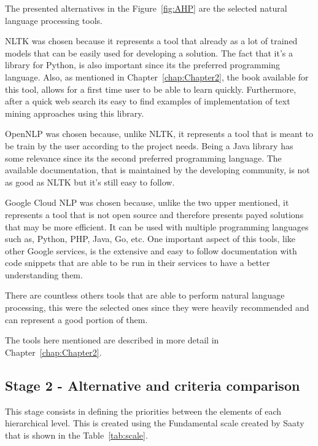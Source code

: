 The presented alternatives in the Figure~\ref{fig:AHP} are the selected natural language processing tools.

NLTK was chosen because it represents a tool that already as a lot of trained models that can be easily used for developing a solution.
The fact that  it's a library for Python, is also important since its the preferred programming language.
Also, as mentioned in Chapter~\ref{chap:Chapter2}, the book available for this tool, allows for a first time user to be able to learn quickly.
Furthermore, after a quick web search its easy to find examples of implementation of text mining approaches using this library.

OpenNLP was chosen because, unlike NLTK, it represents a tool that is meant to be train by the user according to the project needs.
Being a Java library has some relevance since its the second preferred programming language.
The available documentation, that is maintained by the developing community, is not as good as NLTK but it's still easy to follow.

Google Cloud NLP was chosen because, unlike the two upper mentioned, it represents a tool that is not open source and therefore presents payed solutions that may be more efficient.
It can be used with multiple programming languages such as, Python, PHP, Java, Go, etc.
One important aspect of this tools, like other Google services, is the extensive and easy to follow documentation with code snippets that are able to be run in their services to have a better understanding them.

There are countless others tools that are able to perform natural language processing, this were the selected ones since they were heavily recommended and can represent a good portion of them.

The tools here mentioned are described in more detail in Chapter~\ref{chap:Chapter2}.

\subsection{Stage 2 - Alternative and criteria comparison}

This stage consists in defining the priorities between the elements of each hierarchical level.
This is created using the Fundamental scale created by Saaty\cite{saaty1987analytic} that is shown in the Table~\ref{tab:scale}.

